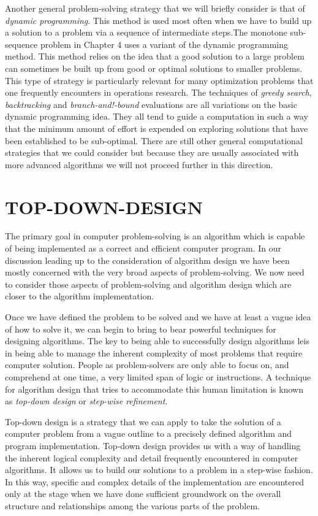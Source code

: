 \documentclass{book}
\begin{document}
	Another general problem-solving strategy that we will briefly consider is that of \textit{dynamic programming}. This method is used most often when we have to build up a solution to a problem via a sequence of intermediate steps.The monotone sub-sequence problem in Chapter 4 uses a variant of the dynamic programming method. This method relies on the idea that a good solution to a large problem can sometimes be built up from good or optimal solutions to smaller problems. This type of strategy is particularly relevant for many optimization problems that one frequently encounters in operations research. The techniques of \textit{greedy search}, \textit{backtracking} and \textit{branch-and!-bound} evaluations are all variations on the basic dynamic programming idea. They all tend to guide a computation in such a way that the minimum amount of effort is expended on exploring solutions that have been established to be sub-optimal. There are still other general computational strategies that we could consider but because they are usually associated with more advanced algorithms we will not proceed further in this direction.

\section{TOP-DOWN-DESIGN}
The primary goal in computer problem-solving is an algorithm which is capable of being implemented as a correct and efficient computer program. In our discussion leading up to the consideration of algorithm design we have been mostly concerned with the very broad aspects of problem-solving. We now need to consider those aspects of problem-solving and algorithm design which are closer to the algorithm implementation.\par

	Once we have defined the problem to be solved and we have at least a vague idea of how to solve it, we can begin to bring to bear powerful techniques for designing algorithms. The key to being able to successfully design algorithms leis in being able to manage the inherent complexity of most problems that require computer solution. People as problem-solvers are only able to focus on, and comprehend at one time, a very limited span of logic or instructions. A technique for algorithm design that tries to accommodate this human limitation is known as \textit{top-down design} or \textit{step-wise refinement}.\par
	
	Top-down design is a strategy that we can apply to take the solution of a computer problem from a vague outline to a precisely defined algorithm and program implementation. Top-down design provides us with a way of handling the inherent logical complexity and detail frequently encountered in computer algorithms. It allows us to build our solutions to a problem in a step-wise fashion. In this way, specific and complex details of the implementation are encountered only at the stage when we have done sufficient groundwork on the overall structure and relationships among the various parts of the problem.
\end{document}
